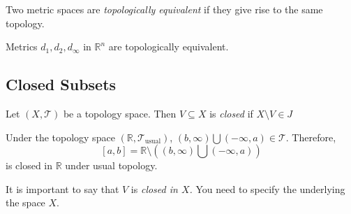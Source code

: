 \begin{definition}[Equivalence]
Two metric spaces are \emph{topologically equivalent} if they give rise to the same topology.
\end{definition}
\begin{example}
Metrics $d_1,d_2,d_\infty$ in $\mathbb{R}^n$ are topologically equivalent.
\end{example}
\subsection{Closed Subsets}
\begin{definition}[Closed]
Let $(X,\mathcal{T})$ be a topology space. Then $V\subseteq X$ is \emph{closed} if $X\setminus V\in J$
\end{definition}
\begin{example}
Under the topology space $(\mathbb{R},\mathcal{T}_{\text{usual}})$, $(b,\infty)\bigcup(-\infty,a)\in\mathcal{T}$. Therefore,
\[
[a,b]=\mathbb{R}\setminus\left((b,\infty)\bigcup(-\infty,a)\right)
\]
is closed in $\mathbb{R}$ under usual topology.
\end{example}

\begin{remark}
It is important to say that $V$ is \emph{closed in $X$.} You need to specify the underlying the space $X$.
\end{remark}

















